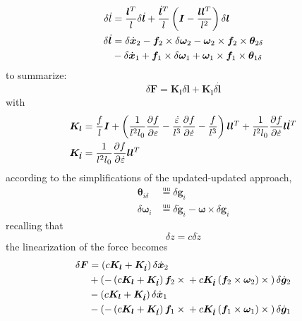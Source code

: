 \documentclass[10pt,dvips,fleqn,subeqn]{report}
\newcommand{\T}[1]{\bm{#1}}
\newcommand{\equu}{\overset{\text{uu}}{=}}
\begin{document}
\begin{subequations}
\begin{align}
	\delta\dot{l} &= \frac{\T{l}^T}{l} \delta\dot{\T{l}}
		+ \frac{\dot{\T{l}}^T}{l}\plbr{\T{I} - \frac{\T{l}\T{l}^T}{l^2}} \delta\T{l} \\
	\delta\dot{\T{l}} &= \delta\dot{\T{x}}_2
		- \T{f}_2 \times \delta\T{\omega}_2 - \T{\omega}_2 \times \T{f}_2 \times \T{\theta}_{2\delta}
		\nonumber \\
		& \mbox{} - \delta\dot{\T{x}}_1
		+ \T{f}_1 \times \delta\T{\omega}_1 + \T{\omega}_1 \times \T{f}_1 \times \T{\theta}_{1\delta}
\end{align}
\end{subequations}
to summarize:
\begin{equation}
	\delta\T{F} = \T{K}_{\T{l}} \delta\T{l} + \T{K}_{\dot{\T{l}}} \delta\dot{\T{l}}
\end{equation}
with
\begin{subequations}
\begin{align}
	\T{K}_{\T{l}} &= \frac{f}{l} \T{I}
		+ \plbr{
			\frac{1}{l^2 l_0} \frac{\partial{f}}{\partial\varepsilon}
			- \frac{\dot{\varepsilon}}{l^3} \frac{\partial{f}}{\partial\dot{\varepsilon}}
			- \frac{f}{l^3}
		}\T{l}\T{l}^T
		+ \frac{1}{l^2 l_0} \frac{\partial{f}}{\partial\dot{\varepsilon}} \T{l}\dot{\T{l}}^T \\
	\T{K}_{\dot{\T{l}}} &= \frac{1}{l^2 l_0} \frac{\partial{f}}{\partial\dot{\varepsilon}} \T{l}\T{l}^T
\end{align}
\end{subequations}
according to the simplifications of the updated-updated approach,
\begin{subequations}
\begin{align}
	\T{\theta}_{i\delta} &\equu \delta\T{g}_i \\
	\delta\T{\omega}_i &\equu \delta\dot{\T{g}}_i - \T{\omega}\times\delta\T{g}_i
\end{align}
\end{subequations}
recalling that
\begin{equation}
	\delta{z} = c \delta\dot{z}
\end{equation}
the linearization of the force becomes
\begin{align}
	\delta\T{F} &= \plbr{c\T{K}_{\T{l}} + \T{K}_{\dot{\T{l}}}} \delta\dot{\T{x}}_2
		\nonumber \\
		& + \plbr{
			- \plbr{c\T{K}_{\T{l}} + \T{K}_{\dot{\T{l}}}} \T{f}_2\times{}
			+ c \T{K}_{\dot{\T{l}}} \plbr{\T{f}_2 \times \T{\omega}_2}\times{}
		} \delta\dot{\T{g}}_2
		\nonumber \\
		& - \plbr{c\T{K}_{\T{l}} + \T{K}_{\dot{\T{l}}}} \delta\dot{\T{x}}_1
		\nonumber \\
		& - \plbr{
			- \plbr{c\T{K}_{\T{l}} + \T{K}_{\dot{\T{l}}}} \T{f}_1\times{}
			+ c \T{K}_{\dot{\T{l}}} \plbr{\T{f}_1 \times \T{\omega}_1}\times{}
		} \delta\dot{\T{g}}_1
\end{align}
\end{document}
